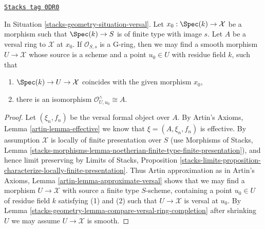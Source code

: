 \begin{lemma}
\label{stacks-geometry-lemma-Artin-approximation-by-smooth-morphism}
\href{https://stacks.math.columbia.edu/tag/0DR0}{\texttt{Stacks tag 0DR0}}

In Situation \ref{stacks-geometry-situation-versal}. Let $x_0 : \Spec(k) \to \mathcal{X}$
be a morphism such that $\Spec(k) \to S$ is of finite type with image $s$.
Let $A$ be a versal ring to $\mathcal{X}$ at $x_0$.
If $\mathcal{O}_{S, s}$ is a G-ring, then we may find a smooth morphism
$U \to \mathcal{X}$ whose source is a scheme and a point
$u_0 \in U$ with residue field $k$, such that
\begin{enumerate}
\item $\Spec(k) \to U \to \mathcal{X}$ coincides with the given morphism $x_0$,
\item there is an isomorphism $\mathcal{O}_{U, u_0}^\wedge \cong A$.
\end{enumerate}
\end{lemma}

\begin{proof}
Let $(\xi_n, f_n)$ be the versal formal object over $A$.
By Artin's Axioms, Lemma \ref{artin-lemma-effective}
we know that $\xi = (A, \xi_n, f_n)$ is effective.
By assumption $\mathcal{X}$ is locally of finite presentation over $S$
(use Morphisms of Stacks, Lemma
\ref{stacks-morphisms-lemma-noetherian-finite-type-finite-presentation}),
and hence limit preserving by Limits of Stacks, Proposition
\ref{stacks-limits-proposition-characterize-locally-finite-presentation}.
Thus Artin approximation as in
Artin's Axioms, Lemma \ref{artin-lemma-approximate-versal}
shows that we may find a morphism $U \to \mathcal{X}$ with
source a finite type $S$-scheme, containing a point $u_0 \in U$
of residue field $k$ satisfying (1) and (2) such that $U \to \mathcal{X}$
is versal at $u_0$. By Lemma \ref{stacks-geometry-lemma-compare-versal-ring-completion}
after shrinking $U$ we may assume $U \to \mathcal{X}$ is smooth.
\end{proof}

